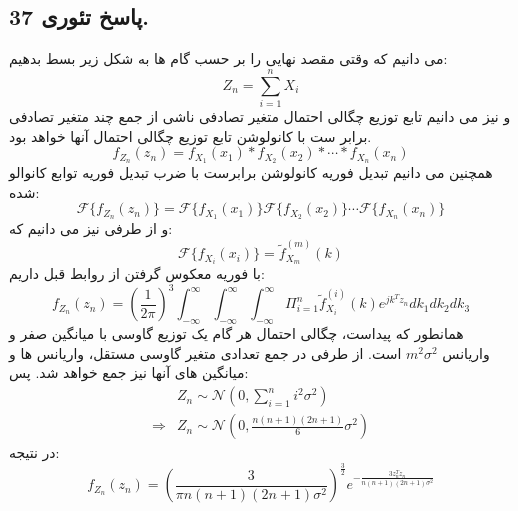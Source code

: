 \documentclass[]{article}
\begin{document}
\subsection{پاسخ تئوری 37.}
می دانیم که وقتی مقصد نهایی را بر حسب گام ها به شکل زیر بسط بدهیم:
\begin{equation}
	\nonumber
	Z_n = \sum_{i = 1}^{n} X_i
\end{equation}
و نیز می دانیم تابع توزیع چگالی احتمال متغیر تصادفی ناشی از جمع چند متغیر تصادفی برابر ست با کانولوشن تابع توزیع چگالی احتمال آنها خواهد بود.
\begin{equation}
	\nonumber
	f_{Z_n}(z_n) = f_{X_1}(x_1) \ast f_{X_2}(x_2) \ast \cdots \ast f_{X_n}(x_n) 
\end{equation}
همچنین می دانیم تبدیل فوریه کانولوشن برابرست با ضرب تبدیل فوریه توابع کانوالو شده:
\begin{equation}
	\nonumber
	\mathcal{F}\{f_{Z_n}(z_n)\} = \mathcal{F}\{f_{X_1}(x_1)\} \mathcal{F}\{f_{X_2}(x_2)\} \cdots \mathcal{F}\{f_{X_n}(x_n) \}
\end{equation}
و از طرفی نیز می دانیم که:
\begin{equation}
	\nonumber
	\mathcal{F}\{f_{X_i}(x_i)\} = \tilde{f}_{X_m}^{(m)}(k)
\end{equation}
با فوریه معکوس گرفتن از روابط قبل داریم:
\begin{equation}
	\nonumber
	f_{Z_n}(z_n) = (\frac{1}{2\pi})^3 \int_{-\infty}^{\infty} \int_{-\infty}^{\infty} \int_{-\infty}^{\infty} \Pi_{i = 1}^{n} \tilde{f}_{X_i}^{(i)}(k) e^{jk^T z_n} dk_1 dk_2 dk_3
\end{equation}
\newpage
همانطور که پیداست، چگالی احتمال هر گام یک توزیع گاوسی با میانگین صفر و واریانس 
$m^2 \sigma^2$
است. از طرفی در جمع تعدادی متغیر گاوسی مستقل، واریانس ها و میانگین های آنها نیز جمع خواهد شد. پس:
\begin{equation}
	\nonumber
	\begin{split}
		&Z_n \sim \mathcal{N}(0, \sum_{i = 1}^{n}i^2 \sigma^2)\\
		\Rightarrow &Z_n \sim \mathcal{N}(0, \frac{n(n+1)(2n+1)}{6}\sigma^2)			
	\end{split}
\end{equation}
در نتیجه:
\begin{equation}
	\nonumber
	f_{Z_n}(z_n) = (\frac{3}{\pi n(n+1)(2n+1)\sigma^2})^{\frac{3}{2}} e^{-\frac{3z_n^T z_n}{n(n+1)(2n+1)\sigma^2}}
\end{equation}
\end{document}
